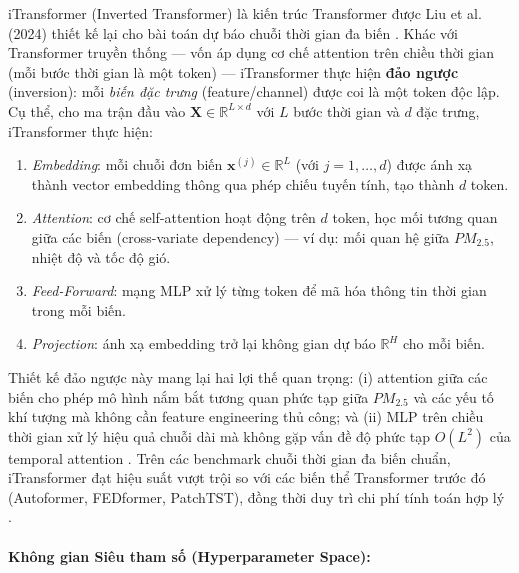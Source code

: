 iTransformer (Inverted Transformer) là kiến trúc Transformer được Liu et al. (2024) thiết kế lại cho bài toán dự báo chuỗi thời gian đa biến \cite{liu2024itransformer}. Khác với Transformer truyền thống — vốn áp dụng cơ chế attention trên chiều thời gian (mỗi bước thời gian là một token) — iTransformer thực hiện \textbf{đảo ngược} (inversion): mỗi \textit{biến đặc trưng} (feature/channel) được coi là một token độc lập. Cụ thể, cho ma trận đầu vào $\mathbf{X} \in \mathbb{R}^{L \times d}$ với $L$ bước thời gian và $d$ đặc trưng, iTransformer thực hiện:
\begin{enumerate}
    \item \textit{Embedding}: mỗi chuỗi đơn biến $\mathbf{x}^{(j)} \in \mathbb{R}^{L}$ (với $j = 1, \ldots, d$) được ánh xạ thành vector embedding thông qua phép chiếu tuyến tính, tạo thành $d$ token.
    \item \textit{Attention}: cơ chế self-attention hoạt động trên $d$ token, học mối tương quan giữa các biến (cross-variate dependency) — ví dụ: mối quan hệ giữa $PM_{2.5}$, nhiệt độ và tốc độ gió.
    \item \textit{Feed-Forward}: mạng MLP xử lý từng token để mã hóa thông tin thời gian trong mỗi biến.
    \item \textit{Projection}: ánh xạ embedding trở lại không gian dự báo $\mathbb{R}^{H}$ cho mỗi biến.
\end{enumerate}
Thiết kế đảo ngược này mang lại hai lợi thế quan trọng: (i) attention giữa các biến cho phép mô hình nắm bắt tương quan phức tạp giữa $PM_{2.5}$ và các yếu tố khí tượng mà không cần feature engineering thủ công; và (ii) MLP trên chiều thời gian xử lý hiệu quả chuỗi dài mà không gặp vấn đề độ phức tạp $O(L^2)$ của temporal attention \cite{liu2024itransformer}. Trên các benchmark chuỗi thời gian đa biến chuẩn, iTransformer đạt hiệu suất vượt trội so với các biến thể Transformer trước đó (Autoformer, FEDformer, PatchTST), đồng thời duy trì chi phí tính toán hợp lý \cite{liu2024itransformer}.

\paragraph{Không gian Siêu tham số (Hyperparameter Space):}

